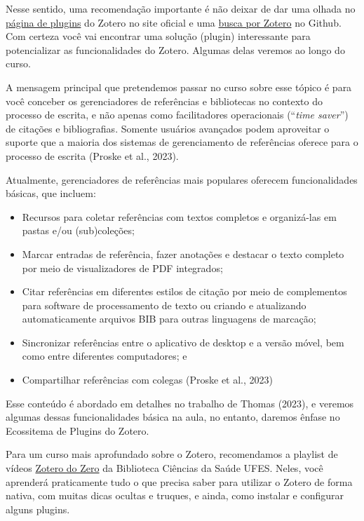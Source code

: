 \documentclass[
  a4paper,
]{book}
\begin{document}
Nesse sentido, uma recomendação importante é não deixar de dar uma
olhada no \href{https://www.zotero.org/support/plugins}{página de
plugins} do Zotero no site oficial e uma
\href{https://github.com/search?q=zotero&type=repositories}{busca por
Zotero} no Github. Com certeza você vai encontrar uma solução (plugin)
interessante para potencializar as funcionalidades do Zotero. Algumas
delas veremos ao longo do curso.

A mensagem principal que pretendemos passar no curso sobre esse tópico é
para você conceber os gerenciadores de referências e bibliotecas no
contexto do processo de escrita, e não apenas como facilitadores
operacionais (``\emph{time saver}'') de citações e bibliografias.
Somente usuários avançados podem aproveitar o suporte que a maioria dos
sistemas de gerenciamento de referências oferece para o processo de
escrita (Proske et al., 2023).

Atualmente, gerenciadores de referências mais populares oferecem
funcionalidades básicas, que incluem:

\begin{itemize}
\item
  Recursos para coletar referências com textos completos e organizá-las
  em pastas e/ou (sub)coleções;
\item
  Marcar entradas de referência, fazer anotações e destacar o texto
  completo por meio de visualizadores de PDF integrados;
\item
  Citar referências em diferentes estilos de citação por meio de
  complementos para software de processamento de texto ou criando e
  atualizando automaticamente arquivos BIB para outras linguagens de
  marcação;
\item
  Sincronizar referências entre o aplicativo de desktop e a versão
  móvel, bem como entre diferentes computadores; e
\item
  Compartilhar referências com colegas (Proske et al., 2023)
\end{itemize}

Esse conteúdo é abordado em detalhes no trabalho de Thomas (2023), e
veremos algumas dessas funcionalidades básica na aula, no entanto,
daremos ênfase no Ecossitema de Plugins do Zotero.

Para um curso mais aprofundado sobre o Zotero, recomendamos a playlist
de vídeos
\href{https://youtube.com/playlist?list=PLEbpo1iiweYXhQs1-yKJhTLPio1PlBD0i&si=bI3_sDEQe58XOCTf}{Zotero
do Zero} da Biblioteca Ciências da Saúde UFES. Neles, você aprenderá
praticamente tudo o que precisa saber para utilizar o Zotero de forma
nativa, com muitas dicas ocultas e truques, e ainda, como instalar e
configurar alguns plugins.
\end{document}
